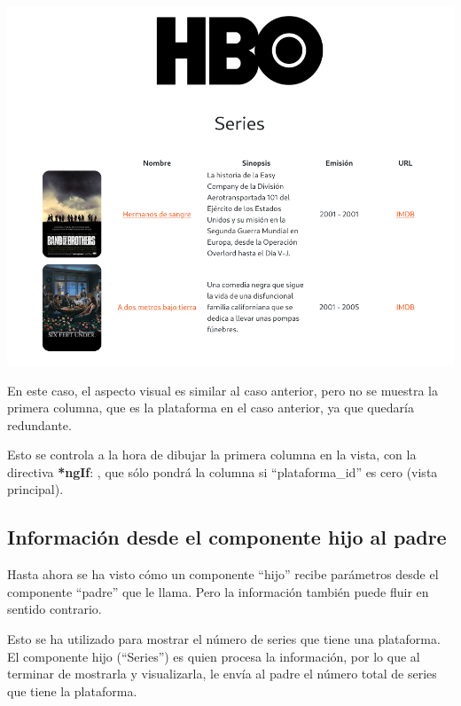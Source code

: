 \documentclass{\ClassPath/viu-tfm-template}
\begin{document}
\begin{itemize}
    \vspace{-0.2em}
    \begin{center}
        \includegraphics[frame,width=0.7\linewidth]{img/series-3.png}
    \end{center}
\end{itemize}

En este caso, el aspecto visual es similar al caso anterior, pero no se muestra la primera columna, que es la plataforma en el caso anterior, ya que quedaría redundante.

Esto se controla a la hora de dibujar la primera columna en la vista,  con la directiva \textbf{*ngIf}: , que sólo pondrá la columna si “plataforma\_id” es cero (vista principal).



\subsection{Información desde el componente hijo al padre}
Hasta ahora se ha visto cómo un componente “hijo” recibe parámetros desde el componente “padre” que le llama. Pero la información también puede fluir en sentido contrario.

Esto se ha utilizado para mostrar el número de series que tiene una plataforma. El componente hijo (“Series”) es quien procesa la información, por lo que al terminar de mostrarla y visualizarla, le envía al padre el número total de series que tiene la plataforma.

\end{document}
